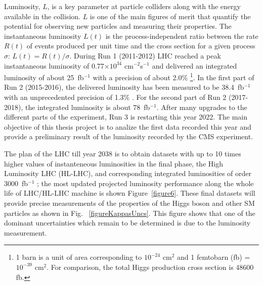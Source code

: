 \documentclass[final,12pt]{article}
\newcommand{\lumi}[1]{{#1~fb$^{-1}$}}
\newcommand{\instlumi}[1]{#1$\times 10^{34}$ cm$^{-2}$s$^{-1}$}
\begin{document}
Luminosity, $L$, is a key parameter at particle colliders along with the energy available in the collision.
$L$ is one of the  main figures of merit that quantify the potential for observing new particles and measuring their properties.
The instantaneous luminosity $L(t)$ is the process-independent ratio between the rate $R(t)$ of events produced per unit time and the cross section for a given process $\sigma$: $L(t) = R(t)/\sigma$.
During Run 1 (2011-2012) LHC reached a peak instantaneous luminosity of \instlumi{0.77} and delivered an integrated luminosity of about \lumi{25} with a precision of about 2.0\% 
\footnote{1 barn is a unit of area corresponding to $10^{-24}$ cm${^2}$ and 1 femtobarn (fb) = $10^{-39}$ cm$^{2}$.
For comparison, the total Higgs production cross section is 48600 fb.}.
In the first part of Run 2 (2015-2016), the delivered luminosity has been measured to be \lumi{38.4} with an unprecedented precision of 1.3\% \cite{Sirunyan:2021qkt-corr}.
For the second part of Run 2 (2017-2018), the integrated luminosity is about \lumi{78}.
After many upgrades to the different parts of the experiment, Run 3 is restarting this year 2022.
The main objective of this thesis project is to analize the first data recorded this year and provide a preliminary result of the luminosity recorded by the CMS experiment. 

The plan of the LHC till year 2038 is to obtain datasets with up to 10 times higher values of instanteneous luminosities in the final phase,
the  High Luminosity LHC (HL-LHC), and corresponding integrated luminosities of order \lumi{3000} \cite{Dainese:3};
the most updated projected luminosity performance along the  whole  life  of  LHC/HL-LHC  machine is shown Figure~\ref{figure6}.
These final datasets will provide  precise measurements of the properties of the Higgs boson and other SM particles as shown in Fig. ~\ref{figureKappasUncs}.
This figure shows that one of the dominant uncertainties which remain to be determined is due to the luminosity measurement.
\end{document}
